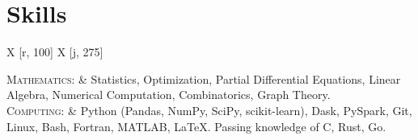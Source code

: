 \documentclass[letterpaper,11pt]{article} %
\newcommand\tabuwidth{\textwidth}  %
\newcommand\rcol{275}  %
\begin{document}

\section{Skills}

\begin{center}
\begin{tabu} to \tabuwidth {X [r, 100] X [j, \rcol]}

\textsc{Mathematics:} &
	Statistics,
	Optimization,
	Partial Differential Equations,
	Linear Algebra,
	Numerical Computation,
	Combinatorics,
	Graph Theory. \\
\textsc{Computing:} &
	Python (Pandas, NumPy, SciPy, scikit-learn),
	Dask,
	PySpark,
	Git,
	Linux,
	Bash,
	Fortran,
	MATLAB,
	\LaTeX.
	Passing knowledge of C, Rust, Go. \\

\end{tabu}
\end{center}
\end{document}
